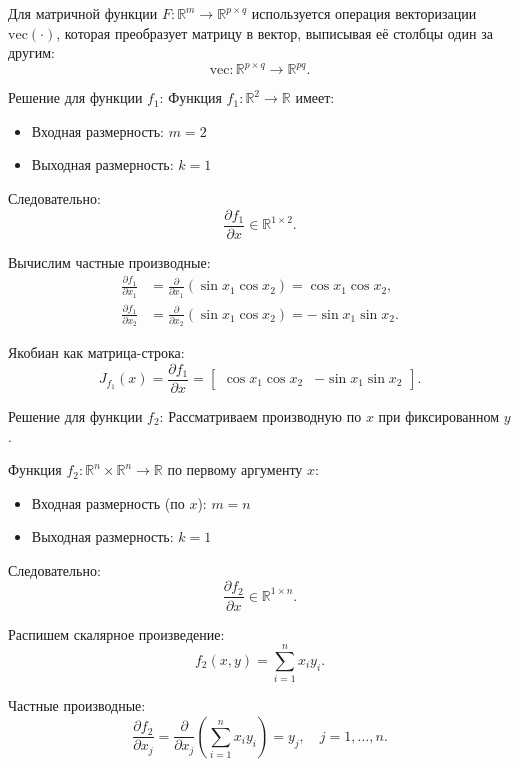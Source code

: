 \documentclass[pract]{SCWorks}
\begin{document}
    Для матричной функции $F: \mathbb{R}^m \to \mathbb{R}^{p \times q}$ используется операция векторизации $\mathrm{vec}(\cdot)$, которая преобразует матрицу в вектор, выписывая её столбцы один за другим:
    \[
    \mathrm{vec}: \mathbb{R}^{p \times q} \to \mathbb{R}^{pq}.
    \]

    Решение для функции $f_1$:
    Функция $f_1: \mathbb{R}^2 \to \mathbb{R}$ имеет:
    \begin{itemize}
        \item[$\bullet$] Входная размерность: $m = 2$
        \item[$\bullet$] Выходная размерность: $k = 1$
    \end{itemize}

    Следовательно:
    \[
    \boxed{\frac{\partial f_1}{\partial x} \in \mathbb{R}^{1 \times 2}}.
    \]

    Вычислим частные производные:
    \[
    \begin{aligned}
    \frac{\partial f_1}{\partial x_1} &= \frac{\partial}{\partial x_1} (\sin x_1 \cos x_2) = \cos x_1 \cos x_2, \\
    \frac{\partial f_1}{\partial x_2} &= \frac{\partial}{\partial x_2} (\sin x_1 \cos x_2) = -\sin x_1 \sin x_2.
    \end{aligned}
    \]

    Якобиан как матрица-строка:
    \[
    \boxed{J_{f_1}(x) = \frac{\partial f_1}{\partial x} =
    \begin{bmatrix}
    \cos x_1 \cos x_2 & -\sin x_1 \sin x_2
    \end{bmatrix}}.
    \]

    Решение для функции $f_2$:
    Рассматриваем производную по $x$ при фиксированном $y$.

    Функция $f_2: \mathbb{R}^n \times \mathbb{R}^n \to \mathbb{R}$ по первому аргументу $x$:
    \begin{itemize}
        \item[$\bullet$] Входная размерность (по $x$): $m = n$
        \item[$\bullet$] Выходная размерность: $k = 1$
    \end{itemize}

    Следовательно:
    \[
    \boxed{\frac{\partial f_2}{\partial x} \in \mathbb{R}^{1 \times n}}.
    \]

    Распишем скалярное произведение:
    \[
    f_2(x, y) = \sum_{i=1}^n x_i y_i.
    \]

    Частные производные:
    \[
    \frac{\partial f_2}{\partial x_j} = \frac{\partial}{\partial x_j} \left( \sum_{i=1}^n x_i y_i \right) = y_j, \quad j = 1, \dots, n.
    \]
\end{document}
